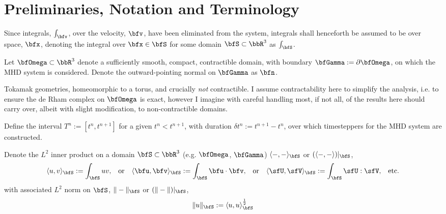 \section*{Preliminaries, Notation and Terminology}
    Since integrals, $\int_{\bfv}$, over the velocity, $\bfv$, have been eliminated from the system, integrals shall henceforth be assumed to be over space, $\bfx$, denoting the integral over $\bfx  \in  \bfS$ for some domain $\bfS  \subset  \bbR^{3}$ as $\int_{\bfS}$.

    \shortline

    Let $\bfOmega  \subset  \bbR^{3}$ denote a sufficiently smooth, compact, contractible domain, with boundary $\bfGamma  :=  \partial\bfOmega$, on which the MHD system is considered. Denote the outward-pointing normal on $\bfGamma$ as $\bfn$.

    \begin{remark}
        Tokamak geometries, homeomorphic to a torus, and crucially \emph{not} contractible. I assume contractability here to simplify the analysis, i.e. to ensure the de Rham complex on $\bfOmega$ is exact, however I imagine with careful handling most, if not all, of the results here should carry over, albeit with slight modification, to non-contractible domains.
    \end{remark}

    Define the interval $T^{n}  :=  \left[t^{n}, t^{n + 1}\right]$ for a given $t^{n}  <  t^{n + 1}$, with duration $\delta t^{n}  :=  t^{n + 1} - t^{n}$, over which timesteppers for the MHD system are constructed.
    
    \shortline

    Denote the $L^{2}$ inner product on a domain $\bfS  \subset  \bbR^{3}$ (e.g. $\bfOmega$, $\bfGamma$) $\langle-, -\rangle_{\bfS}$ or $(\langle-, -\rangle)|_{\bfS}$,
    \begin{align}
        \langle u,    v   \rangle_{\bfS}  :=  \int_{\bfS}uv,  &&
        \text{or}  &&
        \langle \bfu, \bfv\rangle_{\bfS}  :=  \int_{\bfS}\bfu\cdot\bfv,  &&
        \text{or}  &&
        \langle \sfU, \sfV\rangle_{\bfS}  :=  \int_{\bfS}\sfU:\sfV,  &&
        \text{etc.}
    \end{align}
    with associated $L^{2}$ norm on $\bfS$, $\|-\|_{\bfS}$ or $(\|-\|)|_{\bfS}$,
    \begin{equation}
        \|u\|_{\bfS}  :=  \langle u, u\rangle_{\bfS}^{\frac{1}{2}}
    \end{equation}

    \shortline

